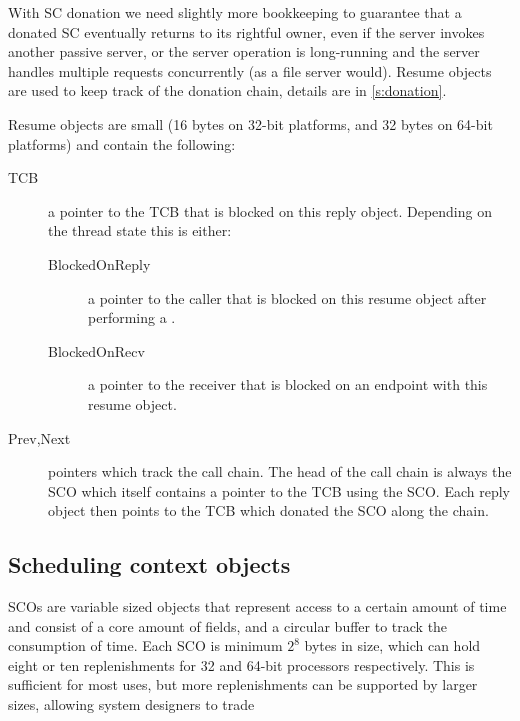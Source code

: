 With \gls{SC} donation we need slightly more bookkeeping to guarantee that a
donated SC eventually returns to its rightful owner, even if the
server invokes another passive server, or the server operation is
long-running and the server handles multiple requests concurrently (as
a file server would). Resume objects are used to keep track of the donation chain, details are in \autoref{s:donation}.

Resume objects are small (16 bytes on 32-bit platforms, and 32 bytes on 64-bit platforms) and
contain the following:

\begin{description}
    \item[TCB] a pointer to the \gls{TCB} that is blocked on this reply object. Depending on the
        thread state this is either: 
        \begin{description}
            \item [BlockedOnReply] a pointer to the caller that is blocked on this resume object
                after performing a \call. 
            \item [BlockedOnRecv] a pointer to the receiver that is blocked on an endpoint with this
                resume object.
        \end{description}
    \item[Prev,Next] pointers which track the call chain. The head of the call chain is always the
        \gls{SCO} which itself contains a pointer to the \gls{TCB} using the \gls{SCO}. Each reply
        object then points to the \gls{TCB} which donated the \gls{SCO} along the chain.
\end{description}


\subsection{Scheduling context objects}
\label{s:sco}

\glspl{SCO} are variable sized objects that represent access to a certain amount of time and
consist of a core amount of fields, and a circular buffer to track the consumption of time.
Each \gls{SCO} is minimum $2^{8}$ bytes in size, which can hold eight or ten replenishments for 32
and 64-bit processors respectively. This is sufficient for most uses, but more replenishments can
be supported by larger sizes, allowing system designers to trade



